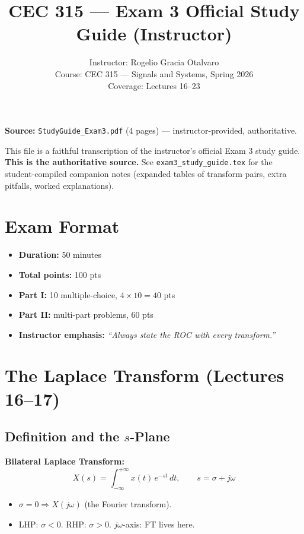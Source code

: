 \documentclass[11pt]{article}
\title{CEC 315 --- Exam 3 Official Study Guide (Instructor)}
\author{Instructor: Rogelio Gracia Otalvaro \\
Course: CEC 315 --- Signals and Systems, Spring 2026 \\
Coverage: Lectures 16--23}
\date{}
\begin{document}
\maketitle

\noindent\textbf{Source:} \texttt{StudyGuide\_Exam3.pdf} (4 pages) --- instructor-provided, authoritative.

\medskip
\noindent This file is a faithful transcription of the instructor's official Exam 3 study guide. \textbf{This is the authoritative source.} See \texttt{exam3\_study\_guide.tex} for the student-compiled companion notes (expanded tables of transform pairs, extra pitfalls, worked explanations).

\tableofcontents
\newpage

\section*{Exam Format}
\begin{itemize}
  \item \textbf{Duration:} 50 minutes
  \item \textbf{Total points:} 100 pts
  \item \textbf{Part I:} 10 multiple-choice, $4 \times 10 = 40$ pts
  \item \textbf{Part II:} multi-part problems, 60 pts
  \item \textbf{Instructor emphasis:} \emph{``Always state the ROC with every transform.''}
\end{itemize}

\section{The Laplace Transform (Lectures 16--17)}

\subsection{Definition and the $s$-Plane}

\textbf{Bilateral Laplace Transform:}
\[ X(s) = \int_{-\infty}^{+\infty} x(t)\,e^{-st}\,dt, \qquad s = \sigma + j\omega \]

\begin{itemize}
  \item $\sigma = 0 \Rightarrow X(j\omega)$ (the Fourier transform).
  \item LHP: $\sigma < 0$. RHP: $\sigma > 0$. $j\omega$-axis: FT lives here.
\end{itemize}
\end{document}
